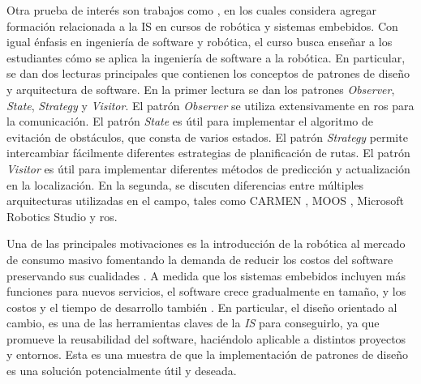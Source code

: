 Otra prueba de interés son trabajos como \cite{Shin15fase}, en los cuales considera agregar formación relacionada a la IS en cursos de robótica y sistemas embebidos. Con igual énfasis en ingeniería de software y robótica, el curso busca enseñar a los estudiantes cómo se aplica la ingeniería de software a la robótica. En particular, se dan dos lecturas principales que contienen los conceptos de patrones de diseño y arquitectura de software. En la primer lectura se dan los patrones \textit{Observer}, \textit{State}, \textit{Strategy} y \textit{Visitor}. El patrón \textit{Observer} se utiliza extensivamente en \gls{ros} para la comunicación. El patrón \textit{State} es útil para implementar el algoritmo de evitación de obstáculos, que consta de varios estados. El patrón \textit{Strategy} permite intercambiar fácilmente diferentes estrategias de planificación de rutas. El patrón \textit{Visitor} es útil para implementar diferentes métodos de predicción y actualización en la localización. En la segunda, se discuten diferencias entre múltiples arquitecturas utilizadas en el campo, tales como CARMEN \cite{carmen}, MOOS \cite{moos}, Microsoft Robotics Studio \cite{microsoft} y \gls{ros}. 

Una de las principales motivaciones es la introducción de la robótica al mercado de consumo masivo fomentando la demanda de reducir los costos del software preservando sus cualidades \cite{Brugali2009}. A medida que los sistemas embebidos incluyen más funciones para nuevos servicios, el software crece gradualmente en tamaño, y los costos y el tiempo de desarrollo también \cite{model2}. En particular, el diseño orientado al cambio, es una de las herramientas claves de la \textit{IS} para conseguirlo, ya que promueve la reusabilidad del software, haciéndolo aplicable a distintos proyectos y entornos. Esta es una muestra de que la implementación de patrones de diseño es una solución potencialmente útil y deseada.

